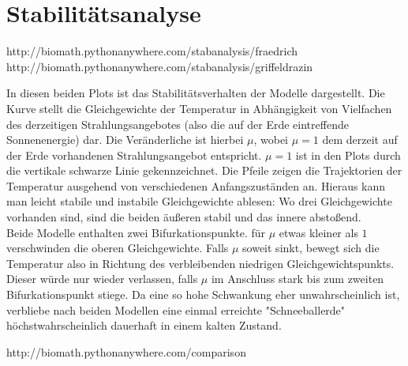 \documentclass[]{report}
\begin{document}
\section{Stabilitätsanalyse}

http://biomath.pythonanywhere.com/stabanalysis/fraedrich
http://biomath.pythonanywhere.com/stabanalysis/griffeldrazin

In diesen beiden Plots ist das Stabilitätsverhalten der Modelle dargestellt. Die Kurve stellt die Gleichgewichte der Temperatur in Abhängigkeit von Vielfachen des derzeitigen Strahlungsangebotes (also die auf der Erde eintreffende Sonnenenergie) dar. Die Veränderliche ist hierbei $\mu$, wobei $\mu = 1$ dem derzeit auf der Erde vorhandenen Strahlungsangebot entspricht. $\mu = 1$ ist in den Plots durch die vertikale schwarze Linie gekennzeichnet. Die Pfeile zeigen die Trajektorien der Temperatur ausgehend von verschiedenen Anfangszuständen an. Hieraus kann man leicht stabile und instabile Gleichgewichte ablesen: Wo drei Gleichgewichte vorhanden sind, sind die beiden äußeren stabil und das innere abstoßend.\\
Beide Modelle enthalten zwei Bifurkationspunkte. für $\mu$ etwas kleiner als $1$ verschwinden die oberen Gleichgewichte. Falls $\mu$ soweit sinkt, bewegt sich die Temperatur also in Richtung des verbleibenden niedrigen Gleichgewichtspunkts. Dieser würde nur wieder verlassen, falls $\mu$ im Anschluss stark bis zum zweiten Bifurkationspunkt stiege. Da eine so hohe Schwankung eher unwahrscheinlich ist, verbliebe nach beiden Modellen eine einmal erreichte "Schneeballerde" höchstwahrscheinlich dauerhaft in einem kalten Zustand.

http://biomath.pythonanywhere.com/comparison
\end{document}
